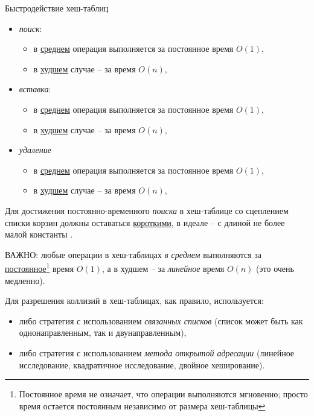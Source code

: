 \documentclass[%
	11pt,
	a4paper,
	utf8,
		]{article}
\begin{document}
Быстродействие хеш-таблиц
\begin{itemize}
	\item \emph{поиск}:
	\begin{itemize}
		\item в \underline{среднем} операция выполняется за постоянное время $ O(1) $,
		
		\item в \underline{худшем} случае -- за время $ O(n) $,
	\end{itemize}
	
	\item \emph{вставка}:
	\begin{itemize}
		\item в \underline{среднем} операция выполняется за постоянное время $ O(1) $,
		
		\item в \underline{худшем} случае -- за время $ O(n) $,
	\end{itemize}

    \item \emph{удаление}
    \begin{itemize}
    	\item в \underline{среднем} операция выполняется за постоянное время $ O(1) $,
    	
    	\item в \underline{худшем} случае -- за время $ O(n) $,
    \end{itemize}
\end{itemize}

Для достижения постоянно-временного \emph{поиска} в хеш-таблице со сцеплением списки корзин должны оставаться \underline{короткими}, в идеале -- с длиной не более малой константы \cite[212]{roughgarden-graph:2019}.

ВАЖНО: любые операции в хеш-таблицах \emph{в среднем} выполняются за \underline{постоянное}\footnote{Постоянное время не означает, что операции выполняются мгновенно; просто время остается постоянным независимо от размера хеш-таблицы} время $ O(1) $, а в худшем -- за \emph{линейное} время $ O(n) $ (это очень медленно).

Для разрешения коллизий в хеш-таблицах, как правило, используется:
\begin{itemize}
	\item либо стратегия с использованием \emph{связанных списков} (список может быть как однонаправленным, так и двунаправленным),
	
	\item либо стратегия с использованием \emph{метода открытой адресации} (линейное исследование, квадратичное исследование, двойное хеширование).
\end{itemize}
\end{document}

